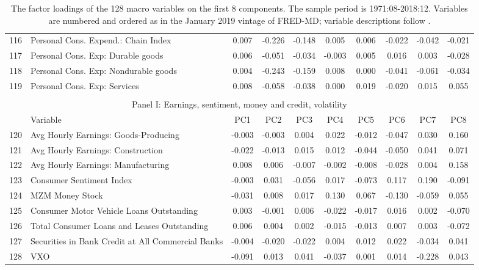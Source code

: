 \begin{table}[!h]
\begin{tabular}{llcccccccc}
116&Personal Cons. Expend.: Chain Index	&	0.007	&	-0.226	&	-0.148	&	0.005	&	0.006	&	-0.022	&	-0.042	&	-0.021	\\
117&Personal Cons. Exp: Durable goods	&	0.006	&	-0.051	&	-0.034	&	-0.003	&	0.005	&	0.016	&	0.003	&	-0.028	\\
118&Personal Cons. Exp: Nondurable goods	&	0.004	&	-0.243	&	-0.159	&	0.008	&	0.000	&	-0.041	&	-0.061	&	-0.034	\\
119&Personal Cons. Exp: Services	&	0.008	&	-0.058	&	-0.038	&	0.000	&	0.019	&	-0.020	&	0.015	&	0.055	\\
\\ \hline
 \multicolumn{10}{c}{Panel I: Earnings, sentiment, money and credit, volatility} \\ 
&Variable&	PC1	&	PC2	&	PC3	&	PC4	&	PC5	&	PC6	&	PC7	&	PC8	\\ \hline
120&Avg Hourly Earnings: Goods-Producing	&	-0.003	&	-0.003	&	0.004	&	0.022	&	-0.012	&	-0.047	&	0.030	&	0.160	\\
121&Avg Hourly Earnings: Construction	&	-0.022	&	-0.013	&	0.015	&	0.012	&	-0.044	&	-0.050	&	0.041	&	0.071	\\
122&Avg Hourly Earnings: Manufacturing	&	0.008	&	0.006	&	-0.007	&	-0.002	&	-0.008	&	-0.028	&	0.004	&	0.158	\\
123&Consumer Sentiment Index	&	-0.003	&	0.031	&	-0.056	&	0.017	&	-0.073	&	0.117	&	0.190	&	-0.091	\\
124&MZM Money Stock	&	-0.031	&	0.008	&	0.017	&	0.130	&	0.067	&	-0.130	&	-0.059	&	0.055	\\
125&Consumer Motor Vehicle Loans Outstanding	&	0.003	&	-0.001	&	0.006	&	-0.022	&	-0.017	&	0.016	&	0.002	&	-0.070	\\
126&Total Consumer Loans and Leases Outstanding	&	0.006	&	0.004	&	0.002	&	-0.015	&	-0.013	&	0.007	&	0.003	&	-0.072	\\
127&Securities in Bank Credit at All Commercial Banks	&	-0.004	&	-0.020	&	-0.022	&	0.004	&	0.012	&	0.022	&	-0.034	&	0.041	\\
128&VXO	&	-0.091	&	0.013	&	0.041	&	-0.037	&	0.001	&	0.014	&	-0.228	&	0.043	\\
 \hline
    \end{tabular}
    \caption{ The factor loadings of the 128 macro variables on the first 8 components. The sample period is 1971:08-2018:12. Variables are numbered and ordered as in the January 2019 vintage of FRED-MD; variable descriptions follow \cite{mccracken2016fred}.}
    \label{macro_loadings3}
\end{table}

